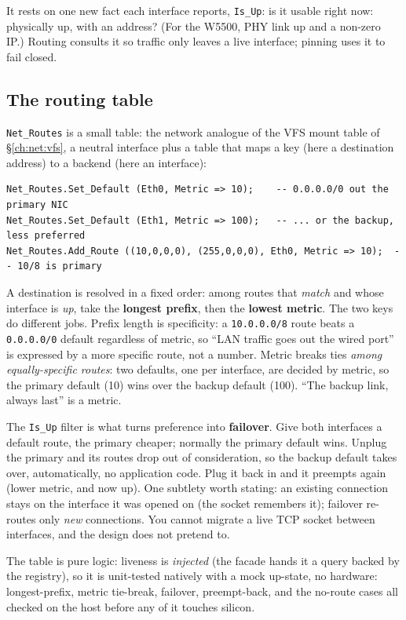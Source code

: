 It rests on one new fact each interface reports, \texttt{Is\_Up}: is it usable right
now: physically up, with an address? (For the W5500, PHY link up and a non-zero
IP.) Routing consults it so traffic only leaves a live interface; pinning uses it to
fail closed.

\subsection{The routing table}

\texttt{Net\_Routes} is a small table: the network analogue of the VFS mount
table of \S\ref{ch:net:vfs}, a neutral interface plus a table that maps a key (here
a destination address) to a backend (here an interface):

\begin{lstlisting}
Net_Routes.Set_Default (Eth0, Metric => 10);    -- 0.0.0.0/0 out the primary NIC
Net_Routes.Set_Default (Eth1, Metric => 100);   -- ... or the backup, less preferred
Net_Routes.Add_Route ((10,0,0,0), (255,0,0,0), Eth0, Metric => 10);  -- 10/8 is primary
\end{lstlisting}

A destination is resolved in a fixed order: among routes that \emph{match} and whose
interface is \emph{up}, take the \textbf{longest prefix}, then the \textbf{lowest
metric}. The two keys do different jobs. Prefix length is specificity: a
\texttt{10.0.0.0/8} route beats a \texttt{0.0.0.0/0} default regardless of metric, so
``LAN traffic goes out the wired port'' is expressed by a more specific route, not a
number. Metric breaks ties \emph{among equally-specific routes}: two defaults, one
per interface, are decided by metric, so the primary default (10) wins over the
backup default (100). ``The backup link, always last'' is a metric.

The \texttt{Is\_Up} filter is what turns preference into \textbf{failover}. Give both
interfaces a default route, the primary cheaper; normally the primary default wins.
Unplug the primary and its routes drop out of consideration, so the backup default
takes over, automatically, no application code. Plug it back in and it preempts again
(lower metric, and now up). One subtlety worth stating: an existing connection stays
on the interface it was opened on (the socket remembers it); failover re-routes only
\emph{new} connections. You cannot migrate a live TCP socket between interfaces, and
the design does not pretend to.

The table is pure logic: liveness is \emph{injected} (the facade hands it a query
backed by the registry), so it is unit-tested natively with a mock up-state, no
hardware: longest-prefix, metric tie-break, failover, preempt-back, and the no-route
cases all checked on the host before any of it touches silicon.

